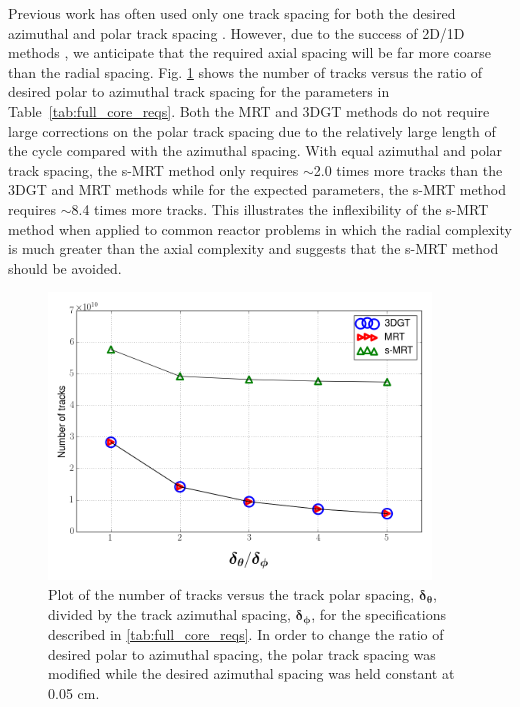 Previous work has often used only one track spacing for both the desired azimuthal and polar track spacing \cite{kochunas, mpact}. However, due to the success of 2D/1D methods \cite{2d1d}, we anticipate that the required axial spacing will be far more coarse than the radial spacing. Fig. \ref{fig:tracks-comp} shows the number of tracks versus the ratio of desired polar to azimuthal track spacing for the parameters in Table~\ref{tab:full_core_reqs}. Both the MRT and 3DGT methods do not require large corrections on the polar track spacing due to the relatively large length of the cycle compared with the azimuthal spacing. With equal azimuthal and polar track spacing, the s-MRT method only requires $\sim$2.0 times more tracks than the 3DGT and MRT methods while for the expected parameters, the s-MRT method requires $\sim$8.4 times more tracks. This illustrates the inflexibility of the s-MRT method when applied to common reactor problems in which the radial complexity is much greater than the axial complexity and suggests that the s-MRT method should be avoided.

\begin{figure}[h]
	\centering
	\includegraphics[width=4in]{figures/mc2015/track_comparison_2.png}
	\caption{Plot of the number of tracks versus the track polar spacing, $\boldsymbol{\delta_\theta}$, divided by the track azimuthal spacing, $\boldsymbol{\delta_\phi}$, for the specifications described in \ref{tab:full_core_reqs}. In order to change the ratio of desired polar to azimuthal spacing, the polar track spacing was modified while the desired azimuthal spacing was held constant at 0.05 cm.}
	\label{fig:tracks-comp}
\end{figure}

